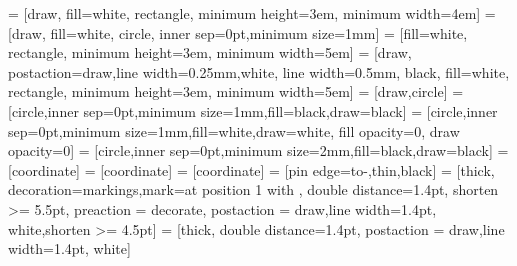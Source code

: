  = [draw, fill=white, rectangle, minimum height=3em, minimum width=4em]
 = [draw, fill=white, circle, inner sep=0pt,minimum size=1mm]
 = [fill=white, rectangle, minimum height=3em, minimum width=5em]
 = [draw, postaction={draw,line width=0.25mm,white}, line width=0.5mm, black, fill=white, rectangle, minimum height=3em, minimum width=5em]
 = [draw,circle]
 = [circle,inner sep=0pt,minimum size=1mm,fill=black,draw=black]
 = [circle,inner sep=0pt,minimum size=1mm,fill=white,draw=white, fill opacity=0, draw opacity=0]
 = [circle,inner sep=0pt,minimum size=2mm,fill=black,draw=black]
 = [coordinate]
 = [coordinate] 
 = [coordinate] 
 = [pin edge={to-,thin,black}] 
 = [thick, decoration={markings,mark=at position
   1 with {}},
   double distance=1.4pt, shorten >= 5.5pt,
   preaction = {decorate},
   postaction = {draw,line width=1.4pt, white,shorten >= 4.5pt}]
 = [thick,
   double distance=1.4pt,
   postaction = {draw,line width=1.4pt, white}]

\newcommand*{\rechterWinkel}[3]{%
   \draw[shift={(#2:#3)}] (#1) arc[start angle=#2, delta angle=90, radius = #3];
   \fill[shift={(#2+45:#3/2)}] (#1) circle[radius=1.25\pgflinewidth];
}

